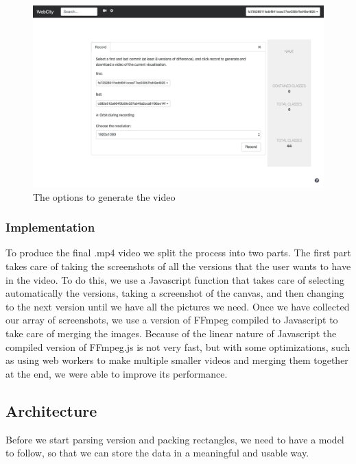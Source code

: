 \documentclass[]{usiinfbachelorproject}
\begin{document}
\begin{figure} [H]
\centering
\includegraphics[width=1\textwidth]{pictures/record_card.png}
\caption{The options to generate the video}
\label{fig:record}
\end{figure}

\subsubsection{Implementation} \label{Implementation}

To produce the final .mp4 video we split the process into two parts.
The first part takes care of taking the screenshots of all the versions that the user wants to have in the video. To do this, we use a Javascript function that takes care of selecting automatically the versions, taking a screenshot of the canvas, and then changing to the next version until we have all the pictures we need.
Once we have collected our array of screenshots, we use a version of FFmpeg compiled to Javascript to take care of merging the images. Because of the linear nature of Javascript the compiled version of FFmpeg.js is not very fast, but with some optimizations, such as using web workers to make multiple smaller videos and merging them together at the end, we were able to improve its performance.

\subsection{Architecture} \label{Architecture}

Before we start parsing version and packing rectangles, we need to have a model to follow, so that we can store the data in a meaningful and usable way.
\end{document}
